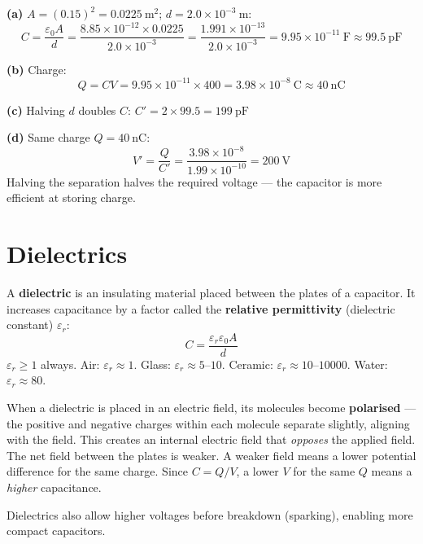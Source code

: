 \begin{solutionbox}
\textbf{(a)} $A = (0.15)^2 = 0.0225\ \text{m}^2$;
$d = 2.0\times10^{-3}\ \text{m}$:
\[
  C = \frac{\varepsilon_0 A}{d}
  = \frac{8.85\times10^{-12} \times 0.0225}
    {2.0\times10^{-3}}
  = \frac{1.991\times10^{-13}}{2.0\times10^{-3}}
  = 9.95\times10^{-11}\ \text{F}
  \approx 99.5\ \text{pF}
\]

\textbf{(b)} Charge:
\[
  Q = CV = 9.95\times10^{-11} \times 400
  = 3.98\times10^{-8}\ \text{C}
  \approx 40\ \text{nC}
\]

\textbf{(c)} Halving $d$ doubles $C$:
$C' = 2 \times 99.5 = 199\ \text{pF}$

\textbf{(d)} Same charge $Q = 40\ \text{nC}$:
\[
  V' = \frac{Q}{C'} = \frac{3.98\times10^{-8}}
  {1.99\times10^{-10}} = 200\ \text{V}
\]
Halving the separation halves the required voltage ---
the capacitor is more efficient at storing charge.
\end{solutionbox}

\section{Dielectrics}

\begin{definitionbox}[Dielectric]
A \textbf{dielectric} is an insulating material placed
between the plates of a capacitor. It increases
capacitance by a factor called the \textbf{relative
permittivity} (dielectric constant) $\varepsilon_r$:
\[
  C = \frac{\varepsilon_r\varepsilon_0 A}{d}
\]
$\varepsilon_r \geq 1$ always.
Air: $\varepsilon_r \approx 1$.
Glass: $\varepsilon_r \approx 5$--$10$.
Ceramic: $\varepsilon_r \approx 10$--$10000$.
Water: $\varepsilon_r \approx 80$.
\end{definitionbox}

\begin{keybox}
When a dielectric is placed in an electric field,
its molecules become \textbf{polarised} --- the
positive and negative charges within each molecule
separate slightly, aligning with the field. This
creates an internal electric field that \textit{opposes}
the applied field. The net field between the plates
is weaker. A weaker field means a lower potential
difference for the same charge. Since $C = Q/V$,
a lower $V$ for the same $Q$ means a \textit{higher}
capacitance.

Dielectrics also allow higher voltages before
breakdown (sparking), enabling more compact capacitors.
\end{keybox}

